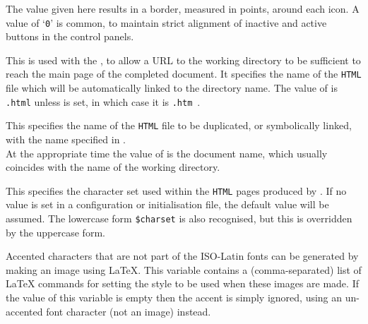 \begin{htmllist}
\item [\fn{\$NAV\_BORDER}\texttt{ = }\Meta{num}\texttt{;}]
The value given here results in a border, measured in points, around each icon.\html{\\}
A value of `\texttt{0}' is common, to maintain strict
alignment of inactive and active buttons in the control panels.


\begin{changebar}
\item [\fn{\$LINKNAME}\texttt{ = '\char34index.\$EXTN\char34';}]
This is used with the  ,
to allow a URL to the working directory to be sufficient to reach the main page
of the completed document.
It specifies the name of the \texttt{HTML} file which will be automatically
linked to the directory name.\html{\\}
The value of  is \texttt{.html} unless  is set,
in which case it is \texttt{.htm}~.

\item [\fn{\$LINKPOINT}\texttt{ = '\char34\$FILE\$EXTN\char34';}]
This specifies the name of the \texttt{HTML} file to be duplicated, or symbolically
linked, with the name specified in .\\
At the appropriate time the value of  is the document name,
which usually coincides with the name of the working directory.

%
%
\item [\fn{\$CHARSET}\texttt{ = 'iso\_8859\_1';}\label{charset}]
This specifies the character set used within the \texttt{HTML} pages
produced by \latextohtml. If no value is set in a configuration
or initialisation file, the default value will be assumed.
The lowercase form \texttt{\$charset} is also recognised, but
this is overridden by the uppercase form.

%
\item [ \fn{\$ACCENT\_IMAGES}\texttt{ = 'large'};]
Accented characters that are not part of the ISO-Latin fonts
can be generated by making an image using \LaTeX.
This variable contains a (comma-separated) list of \LaTeX{} commands
for setting the style to be used when these images are made.
If the value of this variable is empty then the accent is simply
ignored, using an un-accented font character (not an image) instead.
\end{changebar}
%
\end{htmllist}

